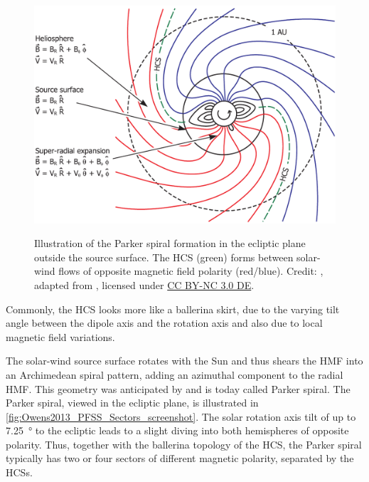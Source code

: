 \begin{figure}[htb]
\begin{floatrow}
{			\includegraphics[width=\Xhsize]{figures_of_others/images/Owens2013_PFSS_Sectors_screenshot.png}
		}{
			\caption{Illustration of the Parker spiral formation in the ecliptic plane outside the source surface. The HCS (green) forms between solar-wind flows of opposite magnetic field polarity (red/blue). Credit: \citet[Fig.~1]{Owens2013}, adapted from \citet[Fig.~1]{Schatten1969}, licensed under \href{https://creativecommons.org/licenses/by-nc/3.0/de/}{CC BY-NC 3.0 DE}.}
			\label{fig:Owens2013_PFSS_Sectors_screenshot}
		}
	\end{floatrow}
\end{figure}
Commonly, the HCS looks more like a ballerina skirt, due to the varying tilt angle between the dipole axis and the rotation axis and also due to local magnetic field variations. 

The solar-wind source surface rotates with the Sun and thus shears the HMF into an Archimedean spiral pattern, adding an azimuthal component to the radial HMF. This geometry was anticipated by \citet{Parker1958} and is today called Parker spiral. The Parker spiral, viewed in the ecliptic plane, is illustrated in \autoref{fig:Owens2013_PFSS_Sectors_screenshot}. The solar rotation axis tilt of up to \SI{7.25}{\degree} to the ecliptic leads to a slight diving into both hemispheres of opposite polarity. Thus, together with the ballerina topology of the HCS, the Parker spiral typically has two or four sectors of different magnetic polarity, separated by the HCSs.

